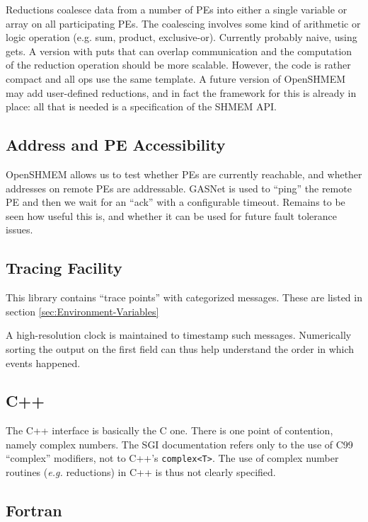\documentclass[english]{article}
\begin{document}
Reductions coalesce data from a number of PEs into either a single
variable or array on all participating PEs. The coalescing involves
some kind of arithmetic or logic operation (e.g. sum, product, exclusive-or).
Currently probably naive, using gets. A version with puts that can
overlap communication and the computation of the reduction operation
should be more scalable. However, the code is rather compact and all
ops use the same template. A future version of OpenSHMEM may add user-defined
reductions, and in fact the framework for this is already in place:
all that is needed is a specification of the SHMEM API.


\subsection{Address and PE Accessibility}

OpenSHMEM allows us to test whether PEs are currently reachable, and
whether addresses on remote PEs are addressable. GASNet is used to
{}``ping'' the remote PE and then we wait for an {}``ack'' with
a configurable timeout. Remains to be seen how useful this is, and
whether it can be used for future fault tolerance issues.


\subsection{Tracing Facility}

This library contains \textquotedblleft{}trace points\textquotedblright{}
with categorized messages. These are listed in section \ref{sec:Environment-Variables}

A high-resolution clock is maintained to timestamp such messages.
Numerically sorting the output on the first field can thus help understand
the order in which events happened.


\subsection{C++}

The C++ interface is basically the C one. There is one point of contention,
namely complex numbers. The SGI documentation refers only to the use
of C99 {}``complex'' modifiers, not to C++'s \texttt{complex<T>}.
The use of complex number routines (\emph{e.g.} reductions) in C++
is thus not clearly specified.


\subsection{Fortran}
\end{document}
